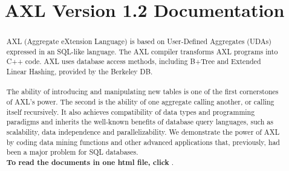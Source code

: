 \documentclass[110pt]{report}
\begin{document}
\setcounter{page}{1}


\title{
AXL Version 1.2 Documentation}

\maketitle
\begin{abstract}
  AXL (Aggregate eXtension Language) is based on User-Defined
  Aggregates (UDAs) expressed in an SQL-like language.  The AXL
  compiler transforms AXL programs into C++ code. AXL uses database
  access methods, including B+Tree and Extended Linear Hashing,
  provided by the Berkeley DB. \\ \\

  The ability of introducing and manipulating new tables is one of the
  first cornerstones of AXL's power. The second is the ability of one
  aggregate calling another, or calling itself recursively. It also
  achieves compatibility of data types and programming paradigms and
  inherits the well-known benefits of database query languages, such
  as scalability, data independence and parallelizability. We
  demonstrate the power of AXL by coding data mining functions and
  other advanced applications that, previously, had been a major
  problem for SQL databases.\\


  {\bf To read the documents in one html file, click }.
\end{abstract}







%
\end{document}

